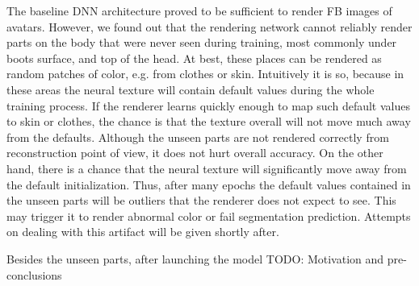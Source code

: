 The baseline DNN architecture \cite{dnn:stylepeople21} proved to be sufficient to render FB images of avatars. However, we found out that the rendering network cannot reliably render parts on the body that were never seen during training, most commonly under boots surface, and top of the head. At best, these places can be rendered as random patches of color, e.g. from clothes or skin. Intuitively it is so, because in these areas the neural texture will contain default values during the whole training process. If the renderer learns quickly enough to map such default values to skin or clothes, the chance is that the texture overall will not move much away from the defaults. Although the unseen parts are not rendered correctly from reconstruction point of view, it does not hurt overall accuracy. On the other hand, there is a chance that the neural texture will significantly move away from the default initialization. Thus, after many epochs the default values contained in the unseen parts will be outliers that the renderer does not expect to see. This may trigger it to render abnormal color or fail segmentation prediction. Attempts on dealing with this artifact will be given shortly after.

Besides the unseen parts, after launching the model
\alert{TODO: Motivation and pre-conclusions}

